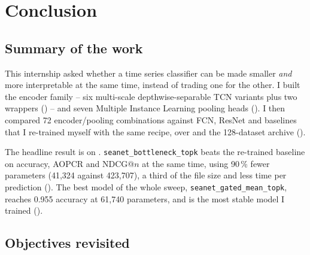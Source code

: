 %

\section{Conclusion}
\label{sec:conclusion}

\subsection*{Summary of the work}

This internship asked whether a time series classifier can be made smaller \emph{and} more
interpretable at the same time, instead of trading one for the other. I built the \seanet{} encoder
family -- six multi-scale depthwise-separable TCN variants plus two wrappers
() -- and seven Multiple Instance Learning pooling heads
(). I then compared 72 encoder/pooling combinations against FCN, ResNet and
\millet{} baselines that I re-trained myself with the same recipe, over \webtraffic{} and the
128-dataset \ucr{} archive ().

The headline result is on \webtraffic{}. \texttt{seanet\_bottleneck\_topk} beats the re-trained
\millet{} baseline on accuracy, AOPCR and NDCG@$n$ at the same time, using 90\,\% fewer parameters
(41{,}324 against 423{,}707), a third of the file size and less time per prediction
(). The best model of the
whole sweep, \texttt{seanet\_gated\_mean\_topk}, reaches 0.955 accuracy at 61{,}740 parameters, and
is the most stable model I trained ().

\subsection*{Objectives revisited}

